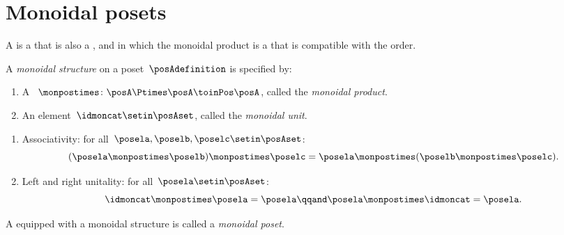 
\section{Monoidal posets}
\label{sec:monoidal-posets}

A  is a  that is also a , and in which the monoidal product is a  that is compatible with the order.

\begin{ctdefinition}
    \label{def:monoidal-poset}
    A \emph{monoidal structure} on a poset~$\posAdefinition$ is specified by:

    \constit
    \begin{enumerate}
        \item A ~$\monpostimes \colon \posA \Ptimes \posA \toinPos \posA$, called the \emph{monoidal product}.
        \item An element~$\idmoncat \setin \posAset$, called the \emph{monoidal unit}.
    \end{enumerate}

    \condit
    \begin{enumerate}
        \item Associativity: for all~$\posela, \poselb, \poselc \setin \posAset$:
              \begin{equation}
                  (\posela \monpostimes \poselb)
                  \monpostimes \poselc =  \posela  \monpostimes ( \poselb \monpostimes \poselc).
              \end{equation}
        \item Left and right unitality: for all~$\posela \setin \posAset$:
              \begin{equation}
                  \idmoncat \monpostimes \posela = \posela
                  \qqand
                  \posela \monpostimes \idmoncat = \posela.
              \end{equation}
    \end{enumerate}

    \noindent A  equipped with a monoidal structure is called a \emph{monoidal poset}.
\end{ctdefinition}

